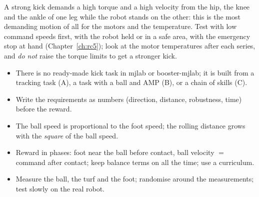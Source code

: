 \begin{aibox}
A strong kick demands a high torque and a high velocity from the hip, the knee and the ankle of one leg while the robot stands on the other: this is the most demanding motion of all for the motors and the temperature. Test with low command speeds first, with the robot held or in a safe area, with the emergency stop at hand (Chapter~\ref{ch:rc5}); look at the motor temperatures after each series, and \emph{do not} raise the torque limits to get a stronger kick.
\end{aibox}

\begin{keyidea}[Summary]
\begin{itemize}[nosep]
 \item There is no ready-made kick task in mjlab or booster-mjlab; it is built from a tracking task (A), a task with a ball and AMP (B), or a chain of skills (C).
 \item Write the requirements as numbers (direction, distance, robustness, time) before the reward.
 \item The ball speed is proportional to the foot speed; the rolling distance grows with the \emph{square} of the ball speed.
 \item Reward in phases: foot near the ball before contact, ball velocity $=$ command after contact; keep balance terms on all the time; use a curriculum.
 \item Measure the ball, the turf and the foot; randomise around the measurements; test slowly on the real robot.
\end{itemize}
\end{keyidea}

